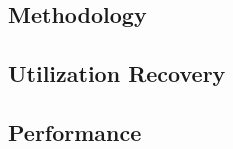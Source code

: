 \documentclass[sigconf, screen, review]{acmart}
\begin{document}
\subsection{Methodology}
\label{sec:methodology}





\subsection{Utilization Recovery}
\label{sec:results-util}

%

\subsection{Performance}
\label{sec:results-perf}
\end{document}
